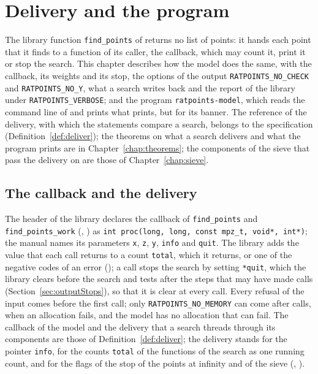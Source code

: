 \chapter{Delivery and the program}\label{chap:output}

The library function \verb|find_points| of \ratpoints{} returns no list of points: it hands each point
that it finds to a function of its caller, the callback, which may count it, print it or stop the
search. This chapter describes how the model does the same, with the callback, its weights and its
stop, the options of the output \verb|RATPOINTS_NO_CHECK| and \verb|RATPOINTS_NO_Y|, what a search
writes back and the report of the library under \verb|RATPOINTS_VERBOSE|; and the program
\verb|ratpoints-model|, which reads the command line of \ratpoints{} and prints what \ratpoints{} prints,
but for its banner. The reference of the delivery, with which the statements compare a search,
belongs to the specification (Definition~\ref{def:deliver}); the theorems on what a search delivers
and what the program prints are in Chapter~\ref{chap:theorems}; the components of the sieve that
pass the delivery on are those of Chapter~\ref{chap:sieve}.

\section{The callback and the delivery}\label{sec:outputCallback}

The header of the library declares the callback of \verb|find_points| and \verb|find_points_work|
(, ) as
\verb|int proc(long, long, const mpz_t, void*, int*)|; the manual names its parameters \verb|x|,
\verb|z|, \verb|y|, \verb|info| and \verb|quit|. The library adds the value that each call returns
to a count \verb|total|, which it returns, or one of the negative codes of an error
(); a call stops the search by setting \verb|*quit|, which the
library clears before the search and tests after the steps that may have made calls
(Section~\ref{sec:outputStops}), so that it is clear at every call. Every refusal of the input comes
before the first call; only \verb|RATPOINTS_NO_MEMORY| can come after calls, when an allocation
fails, and the model has no allocation that can fail. The callback of the model and the delivery
that a search threads through its components are those of Definition~\ref{def:deliver}; the delivery
stands for the pointer \verb|info|, for the counts \verb|total| of the functions of the search as
one running count, and for the flags of the stop of the points at infinity and of the sieve
(, ).

